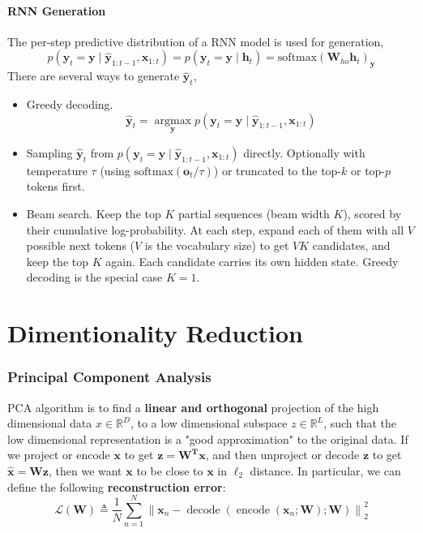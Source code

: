 \documentclass[11pt]{article}
\begin{document}
\subsection{RNN Generation}
The per-step predictive distribution of a RNN model is used for generation,
\[
p(\boldsymbol{y}_t = \boldsymbol{y} \mid \hat{\boldsymbol{y}}_{1:t-1}, \boldsymbol{x}_{1:t})
= p(\boldsymbol{y}_t = \boldsymbol{y} \mid \boldsymbol{h}_t)
= \mathrm{softmax}(\mathbf{W}_{ho}\boldsymbol{h}_t)_{\boldsymbol{y}}
\]
There are several ways to generate $\hat{\boldsymbol{y}}_t$,
\begin{itemize}
    \item Greedy decoding.
    \[
    \hat{\boldsymbol{y}}_t = \operatorname*{argmax}_{\boldsymbol{y}} p(\boldsymbol{y}_t = \boldsymbol{y} \mid \hat{\boldsymbol{y}}_{1:t-1}, \boldsymbol{x}_{1:t})
    \]
    \item Sampling $\hat{\boldsymbol{y}}_t$ from $p(\boldsymbol{y}_t = \boldsymbol{y} \mid \hat{\boldsymbol{y}}_{1:t-1}, \boldsymbol{x}_{1:t})$ directly.
    Optionally with temperature $\tau$ (using $\mathrm{softmax}(\boldsymbol{o}_t/\tau)$) or truncated to the top-$k$ or top-$p$ tokens first.
    \item Beam search. Keep the top $K$ partial sequences (beam width $K$), scored by their cumulative log-probability. At each step, expand each of them with all $V$ possible next tokens ($V$ is the vocabulary size) to get $VK$ candidates, and keep the top $K$ again. Each candidate carries its own hidden state. Greedy decoding is the special case $K=1$.
\end{itemize}


\clearpage
\part{Dimentionality Reduction}
\section{Principal Component Analysis}
PCA algorithm is to find a \textbf{linear and orthogonal} projection of the high dimensional
data $x \in \mathbb{R}^D$, to a low dimensional subspace $z \in \mathbb{R}^L$, such that the low dimensional representation is a "good approximation" to the original data. If we project or encode $\mathbf{x}$ to get $\mathbf{z= W^T x}$, and then unproject or decode $\mathbf{z}$ to get $\mathbf{\hat{x}= Wz}$, then we want $\mathbf{x}$ to be close to $\mathbf{x}$ in $\ell_2$ distance. In particular, we can define the following \textbf{reconstruction error}:
\[
\mathcal{L}(\mathbf{W}) \triangleq \frac{1}{N}\sum_{n=1}^{N}
\left\lVert \mathbf{x}_n - \operatorname{decode}(\operatorname{encode}(\mathbf{x}_n;\mathbf{W});\mathbf{W}) \right\rVert_2^2
\]
\end{document}
